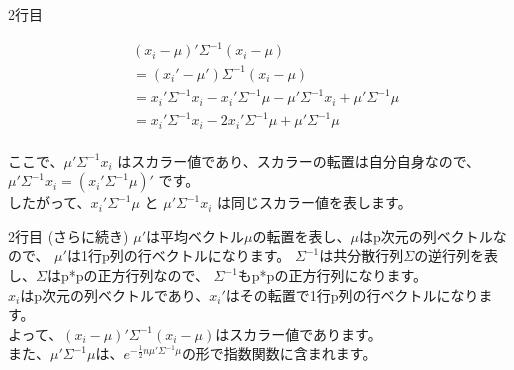 \documentclass{beamer}
\begin{document}
\begin{frame}{2行目} %

\begin{align*}
&(x_i - \mu)'\Sigma^{-1}(x_i - \mu) \\
&= (x_i' - \mu')\Sigma^{-1}(x_i - \mu) \\
&= x_i'\Sigma^{-1}x_i - x_i'\Sigma^{-1}\mu - \mu'\Sigma^{-1}x_i + \mu'\Sigma^{-1}\mu \\
&= x_i'\Sigma^{-1}x_i - 2x_i'\Sigma^{-1}\mu + \mu'\Sigma^{-1}\mu \\
\end{align*}

ここで、$\mu'\Sigma^{-1}x_i$ はスカラー値であり、スカラーの転置は自分自身なので、$\mu'\Sigma^{-1}x_i = (x_i'\Sigma^{-1}\mu)'$ です。\\
したがって、$x_i'\Sigma^{-1}\mu$ と $\mu'\Sigma^{-1}x_i$ は同じスカラー値を表します。

\end{frame}

\begin{frame}{2行目 (さらに続き)} %
$\mu'$は平均ベクトル$\mu$の転置を表し、$\mu$はp次元の列ベクトルなので、
$\mu'$は1行p列の行ベクトルになります。
$\Sigma^{-1}$は共分散行列$\Sigma$の逆行列を表し、$\Sigma$はp*pの正方行列なので、
$\Sigma^{-1}$もp*pの正方行列になります。\\

$x_i$はp次元の列ベクトルであり、$x_i'$はその転置で1行p列の行ベクトルになります。\\[1em]

よって、$(x_i - \mu)' \Sigma^{-1} (x_i - \mu)$はスカラー値であります。\\[0.5em]
また、$\mu'\Sigma^{-1}\mu\text{は、}e^{-\frac{1}{2}n\mu'\Sigma^{-1}\mu}$の形で指数関数に含まれます。
\end{frame}
\end{document}
